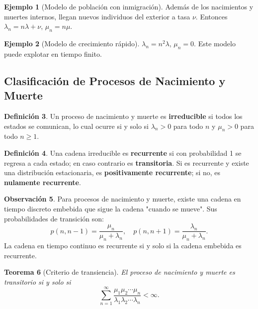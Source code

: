 \documentclass{article}
\theoremstyle{plain}
\newtheorem{Teorema}{Teorema}[section]
\theoremstyle{definition}
\newtheorem{Definicion}[Teorema]{Definici\'on}
\newtheorem{Ejemplo}[Teorema]{Ejemplo}
\newtheorem{Observacion}[Teorema]{Observaci\'on}
\begin{document}
\begin{Ejemplo}[Modelo de poblaci\'on con inmigraci\'on]
  Adem\'as de los nacimientos y muertes internos, llegan nuevos individuos del exterior a tasa $\nu$. Entonces $\lambda_n = n\lambda + \nu$, $\mu_n = n\mu$.
\end{Ejemplo}

\begin{Ejemplo}[Modelo de crecimiento r\'apido]
  $\lambda_n = n^2\lambda$, $\mu_n = 0$. Este modelo puede explotar en tiempo finito.
\end{Ejemplo}

\subsection{Clasificaci\'on de Procesos de Nacimiento y Muerte}

\begin{Definicion}
  Un proceso de nacimiento y muerte es \textbf{irreducible} si todos los estados se comunican, lo cual ocurre si y solo si $\lambda_n > 0$ para todo $n$ y $\mu_n > 0$ para todo $n \geq 1$.
\end{Definicion}

\begin{Definicion}
  Una cadena irreducible es \textbf{recurrente} si con probabilidad 1 se regresa a cada estado; en caso contrario es \textbf{transitoria}. Si es recurrente y existe una distribuci\'on estacionaria, es \textbf{positivamente recurrente}; si no, es \textbf{nulamente recurrente}.
\end{Definicion}

\begin{Observacion}
  Para procesos de nacimiento y muerte, existe una cadena en tiempo discreto embebida que sigue la cadena "cuando se mueve". Sus probabilidades de transici\'on son:
  \[ p(n,n-1) = \frac{\mu_n}{\mu_n + \lambda_n}, \quad p(n,n+1) = \frac{\lambda_n}{\mu_n + \lambda_n}. \]
  La cadena en tiempo continuo es recurrente si y solo si la cadena embebida es recurrente.
\end{Observacion}

\begin{Teorema}[Criterio de transiencia]
  El proceso de nacimiento y muerte es transitorio si y solo si
  \[ \sum_{n=1}^{\infty} \frac{\mu_1 \mu_2 \cdots \mu_n}{\lambda_1 \lambda_2 \cdots \lambda_n} < \infty. \]
\end{Teorema}
\end{document}
